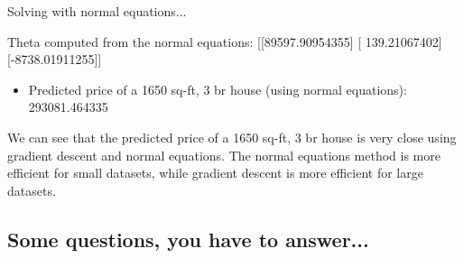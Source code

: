 Solving with normal equations...

Theta computed from the normal equations:
 [[89597.90954355]
 [  139.21067402]
 [-8738.01911255]] 

\begin{itemize}
    \item Predicted price of a 1650 sq-ft, 3 br house 
(using normal equations):
293081.464335
\end{itemize}

We can see that the predicted price of a 1650 sq-ft, 3 br house is very close using gradient descent and normal equations. The normal equations method is more efficient for small datasets, while gradient descent is more efficient for large datasets.

\subsection{ Some questions, you have to answer...}

